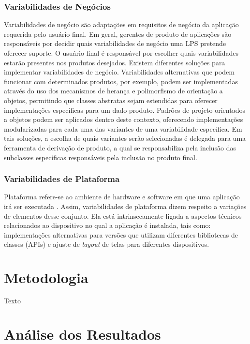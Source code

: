 \subsubsection{Variabilidades de Negócios}
Variabilidades de negócio são adaptações em requisitos de negócio da aplicação
requerida pelo usuário final. Em geral, gerentes de produto de aplicações são
responsáveis por decidir quais variabilidades de negócio uma LPS pretende oferecer
suporte. O usuário final é responsável por escolher quais variabilidades estarão
presentes nos produtos desejados. Existem diferentes soluções para implementar
variabilidades de negócio. Variabilidades alternativas que podem funcionar com
determinados produtos, por exemplo, podem ser implementadas através do uso dos
mecanismos de herança e polimorfismo de orientação a objetos, permitindo que
classes abstratas sejam estendidas para oferecer implementações específicas para
um dado produto. Padrões de projeto orientados a objetos \cite{Gamma1994} podem ser
aplicados dentro deste contexto, oferecendo implementações modularizadas para
cada uma das variantes de uma variabilidade específica. Em tais soluções, a escolha
de quais variantes serão selecionadas é delegada para uma ferramenta de derivação
de produto, a qual se responsabiliza pela inclusão das subclasses específicas
responsáveis pela inclusão no produto final.

\subsubsection{Variabilidades de Plataforma}
Plataforma refere-se ao ambiente de hardware e software em que uma aplicação irá
ser executada \cite{Preuveneers2004}. Assim, variabilidades de plataforma dizem
respeito a variações
de elementos desse conjunto. Ela está intrinsecamente ligada a aspectos técnicos
relacionados ao dispositivo no qual a aplicação é instalada, tais como:
implementações alternativas para versões que utilizam diferentes bibliotecas de classes
(APIs) e ajuste de \textit{layout} de telas para diferentes dispositivos.

\section{Metodologia}

Texto

\section{Análise dos Resultados}

